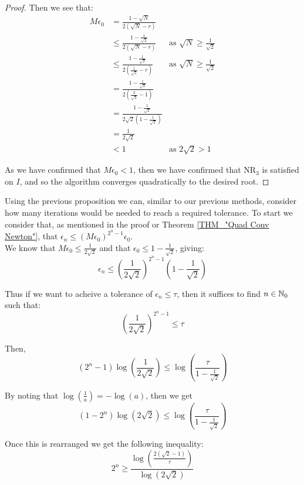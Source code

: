 \begin{proof}
Then we see that:
\begin{displaymath}
\begin{align*}
M\epsilon_0 &= \frac{1 - \sqrt{N}}{2(\sqrt{N} - r)}\\
	&\le \frac{1 - \frac{1}{\sqrt{2}}}{2(\sqrt{N} - r)} 
		& \textrm{as } \sqrt{N} \ge \frac{1}{\sqrt{2}}\\
	&\le \frac{1 - \frac{1}{\sqrt{2}}}{2(\frac{1}{\sqrt{2}}-r)}
		& \textrm{as } \sqrt{N} \ge \frac{1}{\sqrt{2}}\\
	&= \frac{1 - \frac{1}{\sqrt{2}}}{2(\frac{2}{\sqrt{2}} - 1)}\\
	&= \frac{1 - \frac{1}{\sqrt{2}}}{2\sqrt{2}(1-\frac{1}{\sqrt{2}})}\\
	&= \frac{1}{2\sqrt{2}}\\
	&< 1 & \textrm{as } 2\sqrt{2} > 1
\end{align*}
\end{displaymath}

As we have confirmed that \(M\epsilon_0 < 1\), then we have confirmed that \(\mathrm{NR}_3\) is satisfied on \(I\), and so the algorithm converges quadratically to the desired root.
\end{proof}

Using the previous proposition we can, similar to our previous methods, consider how many iterations would be needed to reach a required tolerance. To start we consider that, as mentioned in the proof or Theorem \ref{THM_"Quad Conv Newton"}, that \(\epsilon_n \le (M\epsilon_0)^{2^n - 1}\epsilon_0\).\\

We know that \(M\epsilon_0 \le \frac{1}{2\sqrt{2}}\) and that \(\epsilon_0 \le 1 - \frac{1}{\sqrt{2}}\), giving:
\[\epsilon_n \le \left(\frac{1}{2\sqrt{2}}\right)^{2^n - 1}\left(1 - \frac{1}{\sqrt{2}}\right)\]

Thus if we want to acheive a tolerance of \(\epsilon_n \le \tau\), then it suffices to find \(n \in \mathbb{N}_0\) such that:
\[\left(\frac{1}{2\sqrt{2}}\right)^{2^n - 1} \le \tau\]

Then,
\[(2^n - 1)\log\left(\frac{1}{2\sqrt{2}}\right) \le \log\left(\frac{\tau}{1 - \frac{1}{\sqrt{2}}}\right)\]

By noting that \(\log(\frac{1}{a}) = - \log(a)\), then we get
\[(1-2^n)\log(2\sqrt{2}) \le \log\left(\frac{\tau}{1 - \frac{1}{\sqrt{2}}}\right)\]

Once this is rearranged we get the following inequality:
\[2^n \ge \frac{\log\left(\frac{2(\sqrt{2} - 1)}{\tau}\right)}{\log(2\sqrt{2})}\]

